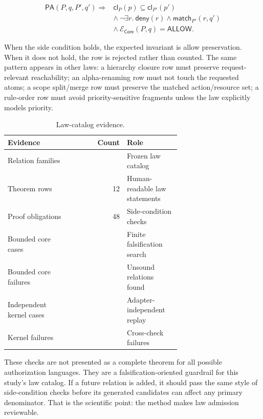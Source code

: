 \documentclass[10pt,conference]{IEEEtran}
\newcommand{\Allow}{\mathsf{ALLOW}}
\newcommand{\Core}{\mathsf{Core}}
\newcommand{\Eval}{\mathcal{E}}
\begin{document}
\begin{equation}
\begin{aligned}
\mathsf{PA}(P,q,P',q') \Rightarrow
& \mathsf{cl}_{P}(p) \subseteq \mathsf{cl}_{P'}(p') \\
& \wedge\ \neg \exists r.\ \mathsf{deny}(r)\wedge \mathsf{match}_{P'}(r,q')\\
& \wedge\ \Eval_{\Core}(P,q)=\Allow.
\end{aligned}
\end{equation}

When the side condition holds, the expected invariant is allow preservation.  When it does not hold, the row is rejected rather than counted.  The same pattern appears in other laws: a hierarchy closure row must preserve request-relevant reachability; an alpha-renaming row must not touch the requested atoms; a scope split/merge row must preserve the matched action/resource set; a rule-order row must avoid priority-sensitive fragments unless the law explicitly models priority.

\begin{table}[t]
\centering
\caption{Law-catalog evidence.}
\label{tab:lawkernel}
\begin{tabular}{p{0.36\linewidth}r p{0.31\linewidth}}
\toprule
Evidence & Count & Role \\
\midrule
Relation families & \LGRelations{} & Frozen law catalog \\
Theorem rows & 12 & Human-readable law statements \\
Proof obligations & 48 & Side-condition checks \\
Bounded core cases & \LGModelCheckCases{} & Finite falsification search \\
Bounded core failures & \LGModelCheckFailures{} & Unsound relations found \\
Independent kernel cases & \LGMechanizedKernelCases{} & Adapter-independent replay \\
Kernel failures & \LGMechanizedKernelFailures{} & Cross-check failures \\
\bottomrule
\end{tabular}
\end{table}

These checks are not presented as a complete theorem for all possible authorization languages.  They are a falsification-oriented guardrail for this study's law catalog.  If a future relation is added, it should pass the same style of side-condition checks before its generated candidates can affect any primary denominator.  That is the scientific point: the method makes law admission reviewable.
\end{document}
